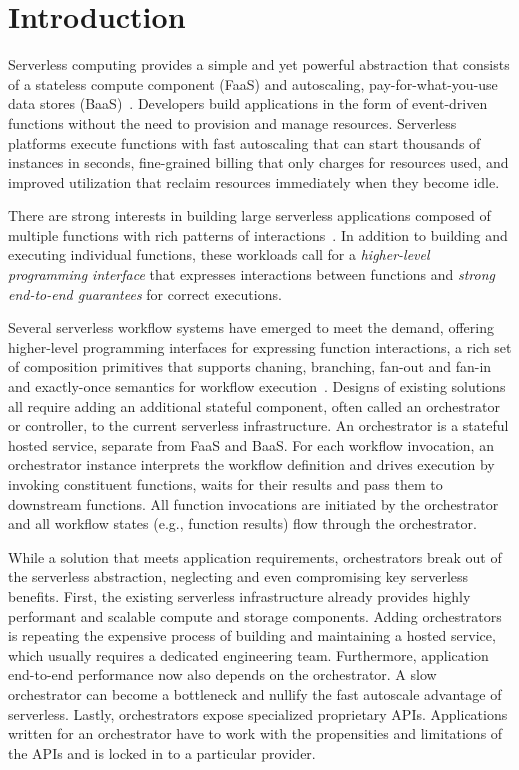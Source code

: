 \section{Introduction}

Serverless computing provides a simple and yet powerful abstraction that
consists of a stateless compute component (FaaS) and autoscaling,
pay-for-what-you-use data stores (BaaS)~\cite{berkeley}. Developers build
applications in the form of event-driven functions without the need to
provision and manage resources. Serverless platforms execute functions with
fast autoscaling that can start thousands of instances in seconds,
fine-grained billing that only charges for resources used, and improved
utilization that reclaim resources immediately when they become idle.

There are strong interests in building large serverless applications composed
of multiple functions with rich patterns of interactions~\cite{excamera,
pywren, gg-atc, beldi, boki}. In addition to building and executing individual
functions, these workloads call for a \emph{higher-level programming
interface} that expresses interactions between functions and \emph{strong
end-to-end guarantees} for correct executions.

Several serverless workflow systems have emerged to meet the demand, offering
higher-level programming interfaces for expressing function interactions, a
rich set of composition primitives that supports chaning, branching, fan-out
and fan-in and exactly-once semantics for workflow execution~\cite{excamera,
gg-atc, aws-step-functions, google-cloud-composer, google-workflows,
durable-functions}. Designs of existing solutions all require adding an
additional stateful component, often called an orchestrator or controller, to
the current serverless infrastructure. An orchestrator is a stateful hosted
service, separate from FaaS and BaaS. For each workflow invocation, an
orchestrator instance interprets the workflow definition and drives execution
by invoking constituent functions, waits for their results and pass them to
downstream functions. All function invocations are initiated by the
orchestrator and all workflow states (e.g., function results) flow through the
orchestrator.

While a solution that meets application requirements, orchestrators break out
of the serverless abstraction, neglecting and even compromising key serverless
benefits. First, the existing serverless infrastructure already provides
highly performant and scalable compute and storage components. Adding
orchestrators is repeating the expensive process of building and maintaining a
hosted service, which usually requires a dedicated engineering team.
Furthermore, application end-to-end performance now also depends on the
orchestrator. A slow orchestrator can become a bottleneck and nullify the fast
autoscale advantage of serverless. Lastly, orchestrators expose specialized
proprietary APIs. Applications written for an orchestrator have to work with
the propensities and limitations of the APIs and is locked in to a particular
provider.

